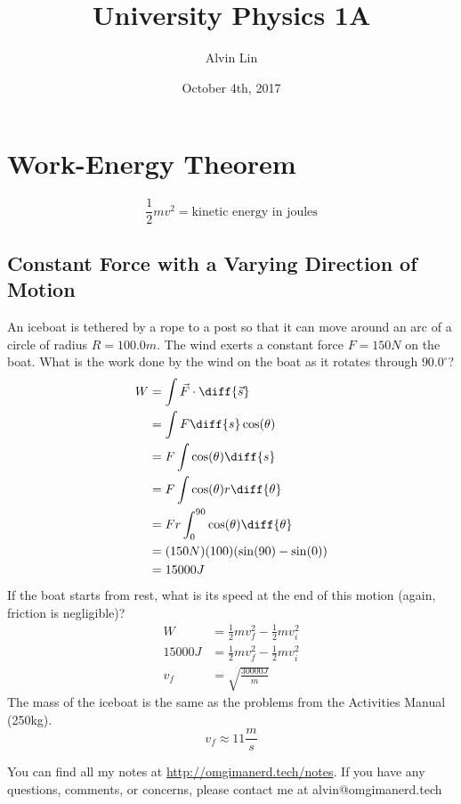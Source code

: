 \documentclass{math}
\title{University Physics 1A}
\author{Alvin Lin}
\date{October 4th, 2017}
\begin{document}
\maketitle

\section*{Work-Energy Theorem}
\[ \frac{1}{2}mv^2 = \text{kinetic energy in joules} \]

\subsection*{Constant Force with a Varying Direction of Motion}
An iceboat is tethered by a rope to a post so that it can move around an arc of
a circle of radius \( R = 100.0m \). The wind exerts a constant force \( F =
150N \) on the boat. What is the work done by the wind on the boat as it rotates
through \( 90.0^{\circ} \)?
\begin{align*}
  W &= \int\vec{F}\cdot\diff{\vec{s}} \\
  &= \int F\diff{s}\cos(\theta) \\
  &= F\int\cos(\theta)\diff{s} \\
  &= F\int\cos(\theta)r\diff{\theta} \\
  &= Fr\int_{0}^{90}\cos(\theta)\diff{\theta} \\
  &= (150N)(100)(\sin(90)-\sin(0)) \\
  &= 15000J
\end{align*}
If the boat starts from rest, what is its speed at the end of this motion
(again, friction is negligible)?
\begin{align*}
  W &= \frac{1}{2}mv_f^2-\frac{1}{2}mv_i^2 \\
  15000J &= \frac{1}{2}mv_f^2-\frac{1}{2}mv_i^2 \\
  v_f &= \sqrt{\frac{30000J}{m}}
\end{align*}
The mass of the iceboat is the same as the problems from the Activities Manual
(250kg).
\[ v_f \approx 11\frac{m}{s} \]

\begin{center}
  You can find all my notes at \url{http://omgimanerd.tech/notes}. If you have
  any questions, comments, or concerns, please contact me at
  alvin@omgimanerd.tech
\end{center}
\end{document}
